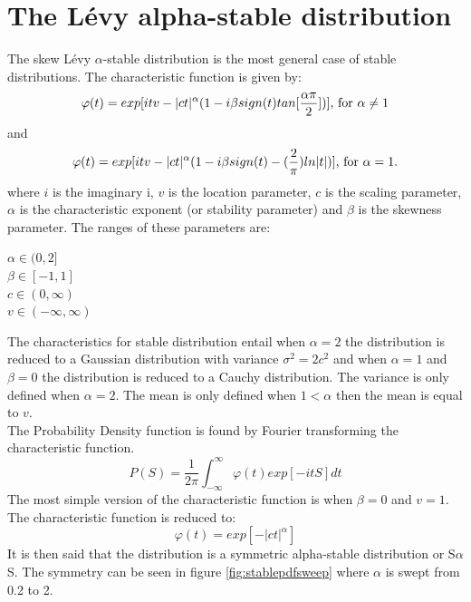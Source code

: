 \section{The Lévy alpha-stable distribution}
The skew Lévy $\alpha$-stable distribution is the most general case of stable distributions. The characteristic function is given by:
\begin{equation}
\varphi (t) = exp[itv - |ct|^{\alpha} (1-i\beta sign(t) tan[\frac{\alpha \pi}{2}])] $, for $ \alpha \neq 1
\end{equation}
and
\begin{equation}
\varphi (t) = exp[itv - |ct|^{\alpha} (1-i\beta sign(t) -(\frac{2}{\pi})ln|t|)] $, for $ \alpha = 1.
\end{equation}
where $i$ is the imaginary i, $v$ is the location parameter, $c$ is the scaling parameter, $\alpha$ is the characteristic exponent (or stability parameter) and $\beta$ is the skewness parameter. The ranges of these parameters are:\\
\begin{center}
$\alpha \in (0, 2]$\\
$\beta \in [-1, 1]$\\
$c \in (0, \infty)$\\
$v \in (-\infty, \infty)$\\
\end{center}
The characteristics for stable distribution entail when $\alpha = 2$ the distribution is reduced to a Gaussian distribution with variance $\sigma^2 = 2c^2$ and when $\alpha = 1$ and $\beta = 0$ the distribution is reduced to a Cauchy distribution. The variance is only defined when $\alpha = 2$. The mean is only defined when $1 < \alpha $ then the mean is equal to $v$.\\
The Probability Density function is found by Fourier transforming the characteristic function.\\
\begin{equation}
P(S) = \frac{1}{2\pi}\int_{-\infty}^{\infty} \varphi(t) exp[-itS] dt
\label{eq:fourier}
\end{equation}
The most simple version of the characteristic function is when $\beta = 0$ and $v = 1$. The characteristic function is reduced to:
\begin{equation}
\varphi (t) = exp[- |ct|^{\alpha}]
\label{eq:reducedcharfunc}
\end{equation}
It is then said that the distribution is a symmetric alpha-stable distribution or S$\alpha$S. The symmetry can be seen in figure \ref{fig:stablepdfsweep} where $\alpha$ is swept from 0.2 to 2. 
